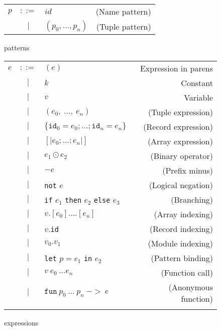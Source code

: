 \begin{figure}
  \centering
  \begin{tabular}{@{}lclr}
    $p$ & $::=$ & $id$ & (Name pattern) \\
        & $|$   & $(p_0, \ldots, p_n)$ & (Tuple pattern) \\
  \end{tabular}
  \caption{\fshark{} patterns}
\end{figure}

\begin{figure}
  \centering
  \begin{tabular}{lclr}
    $e$ & $::=$ & $(e)$ & Expression in parens \\
        & $|$   & $k$ & Constant \\
        & $|$   & $v$ & Variable \\
        & $|$   & $(e_0,~\ldots,~e_n)$ & (Tuple expression) \\
        & $|$   & $\{\texttt{id}_0=e_0 ; \ldots ; \texttt{id}_n=e_n\}$ & (Record expression) \\
        & $|$   & $[\vert e_0 ; \ldots ; e_n\vert]$ & (Array expression) \\
        & $|$   & $e_1 \odot e_2$ & (Binary operator) \\
        & $|$   & $-e$ & (Prefix minus) \\
        & $|$   & \texttt{not} $e$ & (Logical negation) \\
        & $|$   & \texttt{if} $e_1$ \texttt{then} $e_2$ \texttt{else} $e_3$ & (Branching) \\
        & $|$   & $v.[e_0] \ldots .[e_n]$ & (Array indexing) \\
        & $|$   & $v$.\texttt{id} & (Record indexing) \\
        & $|$   & $v_0.v_1$ & (Module indexing) \\
        & $|$   & \texttt{let} $p = e_1$ \texttt{in} $e_2$ & (Pattern binding) \\
        & $|$   & $v~e_0~\ldots e_n$ & (Function call) \\
        & $|$   & $\mathtt{fun}~p_0~\ldots~p_n~\mathtt{->}~e$ & (Anonymous function) \\

    \\
  \end{tabular}
  \caption{\fshark{} expressions}
\end{figure}

